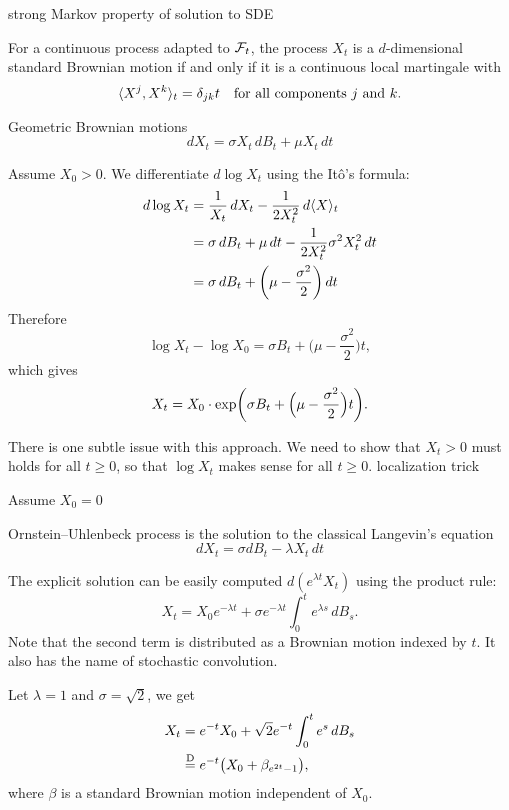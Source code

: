 \documentclass[10pt]{book}
\begin{document}
strong Markov property of solution to SDE

\begin{namedthm}
    For a continuous process adapted to $\mathcal{F}_t$, the process $X_t$ is a $d$-dimensional standard Brownian motion if and only if it is a continuous local martingale with \[
        \langle X^j, X^k \rangle_t = \delta_{jk}t \quad \text{for all components $j$ and $k$.}
    \]
\end{namedthm}

\begin{namedthm}
    
\end{namedthm}

Geometric Brownian motions
\[
    dX_t = \sigma X_t\,dB_t + \mu X_t\,dt
\]

Assume $X_0 > 0$. We differentiate $d\log X_t$ using the Itô's formula: \begin{align*}
    d \log X_t & = \frac{1}{X_t}\,dX_t - \frac{1}{2X_t^2} \,d\langle X \rangle_t\\
    & = \sigma \,dB_t + \mu \,dt - \frac{1}{2X_t^2} \sigma^2 X_t^2\,dt \\
    & = \sigma \,dB_t + \biggl(\mu  - \frac{\sigma^2}{2}\biggr)\,dt
\end{align*}
Therefore \[
    \log X_t - \log X_0 = \sigma B_t + \biggl(\mu  - \frac{\sigma^2}{2}\biggr)t,
\] which gives \[
    X_t = X_0 \cdot \exp \biggl(\sigma B_t + \Bigl(\mu  - \frac{\sigma^2}{2}\Bigr) t\biggr).
\]

There is one subtle issue with this approach. We need to show that $X_t > 0$ must holds for all $t \geq 0$, so that $\log X_t$ makes sense for all $t \geq 0$.
localization trick

Assume $X_0 = 0$


Ornstein--Uhlenbeck process is the solution to the classical Langevin's equation 
\begin{equation} \label{eq:classical-Langevin}
    dX_t = \sigma dB_t - \lambda X_t\,dt
\end{equation}

The explicit solution can be easily computed $d(e^{\lambda t} X_t)$ using the product rule: \[X_t = X_0 e^{- \lambda t} + \sigma e^{-\lambda t} \int_0^t e^{\lambda s}\,dB_s.\] Note that the second term is distributed as a Brownian motion indexed by $t$. It also has the name of stochastic convolution.

Let $\lambda  = 1$ and $\sigma = \sqrt{2}$, we get \begin{align*}
     X_t & = e^{- t}X_0 + \sqrt{2} e^{-t}\int_{0}^t e^{s}\,dB_s\\
     & \stackrel{\mathrm{D}}{=} e^{-t}\bigl(X_0 + \beta_{e^{2t} -1}\bigr),
\end{align*}
where $\beta$ is a standard Brownian motion independent of $X_0$.
\end{document}
